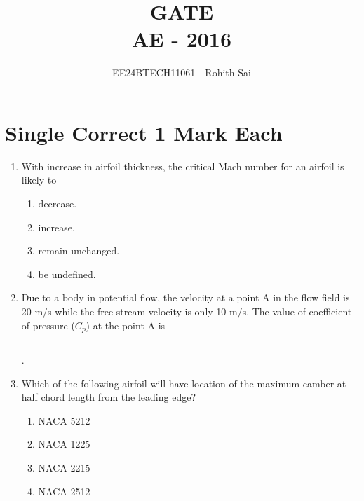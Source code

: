 \documentclass[journal]{IEEEtran}
\begin{document}

\vspace{3cm}

\title{GATE\\AE - 2016}
\author{EE24BTECH11061 - Rohith Sai}
\maketitle

\renewcommand{\thefigure}{\theenumi}
\renewcommand{\thetable}{\theenumi}

\section*{Single Correct 1 Mark Each}
\begin{enumerate}
\item With increase in airfoil thickness, the critical Mach number for an airfoil is likely to
\begin{multicols}{2}
    \begin{enumerate}
        \item decrease.
        \item increase.
        \item remain unchanged.
        \item be undefined.
    \end{enumerate}
\end{multicols}

\item Due to a body in potential flow, the velocity at a point A in the flow field is 20 m/s while the free stream velocity is only 10 m/s. The value of coefficient of pressure ($C_p$) at the point A is \rule{1cm}{0.15mm} .
    
\item Which of the following airfoil will have location of the maximum camber at half chord length from the leading edge?
\begin{multicols}{2}
    \begin{enumerate}
        \item NACA 5212
        \item NACA 1225
        \item NACA 2215
        \item NACA 2512
    \end{enumerate}
\end{multicols}
\end{enumerate}
\end{document}

